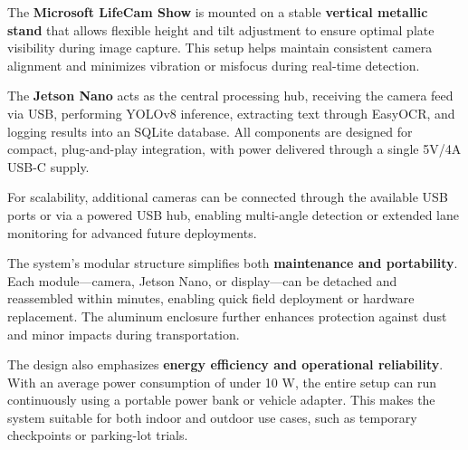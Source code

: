 \vspace{0.4cm}
\noindent
The \textbf{Microsoft LifeCam Show} is mounted on a stable \textbf{vertical metallic stand} that allows flexible height and tilt adjustment to ensure optimal plate visibility during image capture.  
This setup helps maintain consistent camera alignment and minimizes vibration or misfocus during real-time detection.

\vspace{0.3cm}
\noindent
The \textbf{Jetson Nano} acts as the central processing hub, receiving the camera feed via USB, performing YOLOv8 inference, extracting text through EasyOCR, and logging results into an SQLite database.  
All components are designed for compact, plug-and-play integration, with power delivered through a single 5V/4A USB-C supply.

\vspace{0.3cm}
\noindent
For scalability, additional cameras can be connected through the available USB ports or via a powered USB hub, enabling multi-angle detection or extended lane monitoring for advanced future deployments.

\vspace{0.3cm}
\noindent
The system’s modular structure simplifies both \textbf{maintenance and portability}.  
Each module—camera, Jetson Nano, or display—can be detached and reassembled within minutes, enabling quick field deployment or hardware replacement.  
The aluminum enclosure further enhances protection against dust and minor impacts during transportation.

\vspace{0.3cm}
\noindent
The design also emphasizes \textbf{energy efficiency and operational reliability}.  
With an average power consumption of under 10 W, the entire setup can run continuously using a portable power bank or vehicle adapter.  
This makes the system suitable for both indoor and outdoor use cases, such as temporary checkpoints or parking-lot trials.